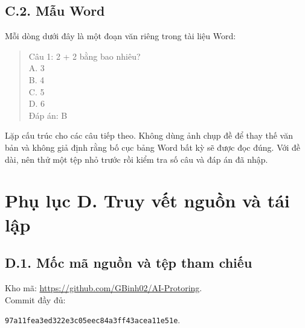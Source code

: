 \section*{C.2. Mẫu Word}
Mỗi dòng dưới đây là một đoạn văn riêng trong tài liệu Word:
\begin{quote}
Câu 1: 2 + 2 bằng bao nhiêu?\\
A. 3\\
B. 4\\
C. 5\\
D. 6\\
Đáp án: B
\end{quote}
Lặp cấu trúc cho các câu tiếp theo. Không dùng ảnh chụp đề để thay thế văn bản và không giả định rằng bố cục bảng Word bất kỳ sẽ được đọc đúng. Với đề dài, nên thử một tệp nhỏ trước rồi kiểm tra số câu và đáp án đã nhập.

\chapter*{Phụ lục D. Truy vết nguồn và tái lập}
\setcounter{table}{0}
\renewcommand{\theHtable}{appendixD.\arabic{table}}
\setcounter{lstlisting}{0}
\section*{D.1. Mốc mã nguồn và tệp tham chiếu}
Kho mã: \url{https://github.com/GBinh02/AI-Protoring}.\\
Commit đầy đủ:\par
\noindent\texttt{97a11fea3ed322e3c05eec84a3ff43acea11e51e}.


